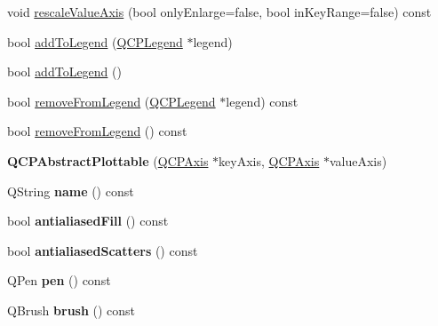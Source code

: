 \begin{DoxyCompactItemize}
\item 
void \hyperlink{class_q_c_p_abstract_plottable_a4336ede4d4ef615022356316d9e9c362}{rescale\+Value\+Axis} (bool only\+Enlarge=false, bool in\+Key\+Range=false) const 
\item 
bool \hyperlink{class_q_c_p_abstract_plottable_aa64e93cb5b606d8110d2cc0a349bb30f}{add\+To\+Legend} (\hyperlink{class_q_c_p_legend}{Q\+C\+P\+Legend} $\ast$legend)
\item 
bool \hyperlink{class_q_c_p_abstract_plottable_a70f8cabfd808f7d5204b9f18c45c13f5}{add\+To\+Legend} ()
\item 
bool \hyperlink{class_q_c_p_abstract_plottable_a26d936d11852ea08e6bc0edae3a514a2}{remove\+From\+Legend} (\hyperlink{class_q_c_p_legend}{Q\+C\+P\+Legend} $\ast$legend) const 
\item 
bool \hyperlink{class_q_c_p_abstract_plottable_aa1f350e510326d012b9a9c9249736c83}{remove\+From\+Legend} () const 
\item 
{\bfseries Q\+C\+P\+Abstract\+Plottable} (\hyperlink{class_q_c_p_axis}{Q\+C\+P\+Axis} $\ast$key\+Axis, \hyperlink{class_q_c_p_axis}{Q\+C\+P\+Axis} $\ast$value\+Axis)\hypertarget{class_q_c_p_abstract_plottable_af78a036e40db6f53a31abadc5323715a}{}\label{class_q_c_p_abstract_plottable_af78a036e40db6f53a31abadc5323715a}

\item 
Q\+String {\bfseries name} () const \hypertarget{class_q_c_p_abstract_plottable_a1affc1972938e4364a9325e4e4e4dcea}{}\label{class_q_c_p_abstract_plottable_a1affc1972938e4364a9325e4e4e4dcea}

\item 
bool {\bfseries antialiased\+Fill} () const \hypertarget{class_q_c_p_abstract_plottable_a68d1c358db03faae376ec47c589abf27}{}\label{class_q_c_p_abstract_plottable_a68d1c358db03faae376ec47c589abf27}

\item 
bool {\bfseries antialiased\+Scatters} () const \hypertarget{class_q_c_p_abstract_plottable_aefc379bcc011660a5371ecc6088a97eb}{}\label{class_q_c_p_abstract_plottable_aefc379bcc011660a5371ecc6088a97eb}

\item 
Q\+Pen {\bfseries pen} () const \hypertarget{class_q_c_p_abstract_plottable_a41d060007cc6b3037c9c04d22d0c0398}{}\label{class_q_c_p_abstract_plottable_a41d060007cc6b3037c9c04d22d0c0398}

\item 
Q\+Brush {\bfseries brush} () const \hypertarget{class_q_c_p_abstract_plottable_aa74cdceb9c7286ef116fbfa58e0326e7}{}\label{class_q_c_p_abstract_plottable_aa74cdceb9c7286ef116fbfa58e0326e7}


\end{DoxyCompactItemize}
